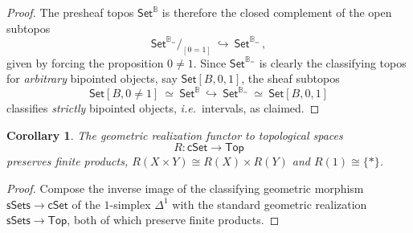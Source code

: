 \documentclass[11pt,reqno]{amsart}
\newcommand{\ie}{\emph{i.e.}}
\newcommand{\B}{\ensuremath{\mathbb{B}}}
\newcommand{\Set}{\ensuremath{\mathsf{Set}}}
\newcommand{\cSet}{\ensuremath{\mathsf{cSet}}}
\newcommand{\hook}{\ensuremath{\hookrightarrow}}
\renewcommand{\to}{\ensuremath{\rightarrow}}
\newtheorem{corollary}[theorem]{Corollary}
\theoremstyle{remark}
\theoremstyle{definition}
\begin{document}
\begin{proof}
The presheaf topos $\Set^\B$ is therefore the closed complement of the open subtopos
\[
\Set^{\B_=}\!/_{\![0=1]}\ \hook\ \Set^{\B_=}\,,
\]
given by forcing the proposition $0 \neq 1$.  Since $\Set^{\B_=}$ is clearly the classifying topos for \emph{arbitrary} bipointed objects, say $\Set[B, 0,1]$, the sheaf subtopos 
\[
 \Set[B, 0\neq 1]\ \simeq\ \Set^\B\ \hook\ \Set^{\B_=}\ \simeq\ \Set[B, 0,1]
\]
classifies \emph{strictly} bipointed objects, \ie\ intervals, as claimed.
\end{proof}
	

\begin{corollary}
The geometric realization functor to topological spaces 
\[
R: \cSet \to \mathsf{Top}
\]
preserves finite products, $R(X\times Y) \cong R(X)\times R(Y)$ and $R(1) \cong \{*\}$.
\end{corollary}

\begin{proof}
Compose the inverse image of the classifying geometric morphism $\mathsf{sSets} \to \cSet$ of the $1$-simplex $\Delta^1$ with the standard geometric realization $\mathsf{sSets} \to \mathsf{Top}$, both of which preserve finite products.
\end{proof}
\end{document}
